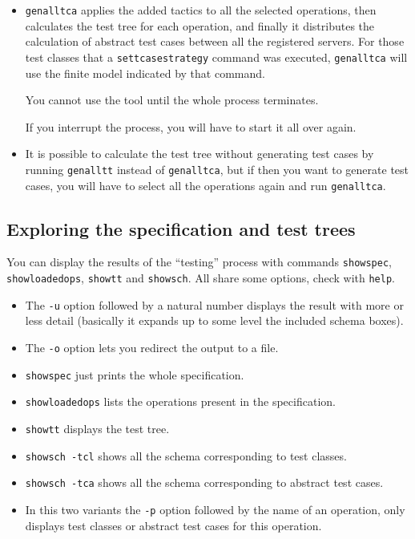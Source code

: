 \begin{itemize}
\item \verb+genalltca+ applies the added tactics to all the selected operations, then calculates the test tree for each operation, and finally it distributes the calculation of abstract test cases between all the registered servers. For those test classes that a \verb+settcasestrategy+ command was executed, \verb+genalltca+ will use the finite model indicated by that command.

You cannot use the tool until the whole process terminates. 

If you interrupt the process, you will have to start it all over again.

\item It is possible to calculate the test tree without generating test cases by running \verb+genalltt+ instead of \verb+genalltca+, but if then you want to generate test cases, you will have to select all the operations again and run \verb+genalltca+.
\end{itemize}

\subsection{Exploring the specification and test trees}

You can display the results of the ``testing'' process with commands \verb+showspec+, \verb+showloadedops+, \verb+showtt+ and \verb+showsch+. All share some options, check with \verb+help+.

\begin{itemize}
\item The \verb+-u+ option followed by a natural number displays the result with more or less detail (basically it expands up to some level the included schema boxes). 

\item The \verb+-o+ option lets you redirect the output to a file.

\item \verb+showspec+ just prints the whole specification.

\item \verb+showloadedops+ lists the operations present in the specification.

\item \verb+showtt+ displays the test tree.

\item \verb+showsch -tcl+ shows all the schema corresponding to test classes.

\item \verb+showsch -tca+ shows all the schema corresponding to abstract test cases.

\item In this two variants the \verb+-p+ option followed by the name of an operation, only displays test classes or abstract test cases for this operation.
\end{itemize}




%

